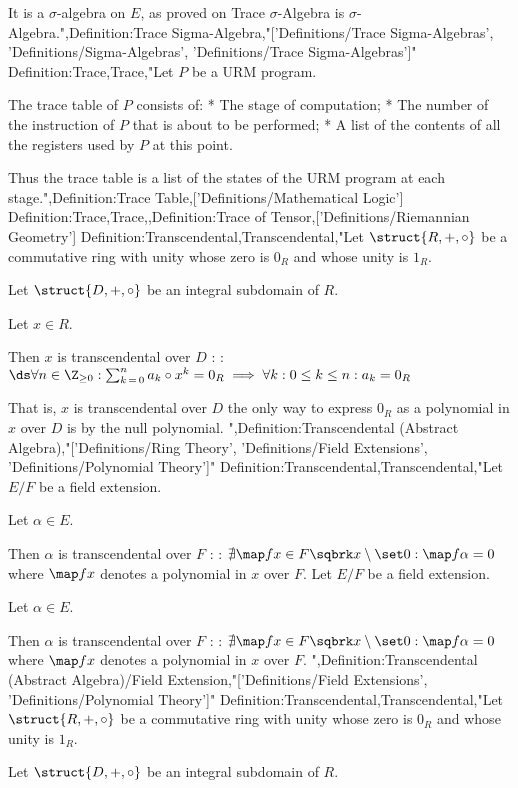 It is a $\sigma$-algebra on $E$, as proved on Trace $\sigma$-Algebra is $\sigma$-Algebra.",Definition:Trace Sigma-Algebra,"['Definitions/Trace Sigma-Algebras', 'Definitions/Sigma-Algebras', 'Definitions/Trace Sigma-Algebras']"
Definition:Trace,Trace,"Let $P$ be a URM program.

The trace table of $P$ consists of:
* The stage of computation;
* The number of the instruction of $P$ that is about to be performed;
* A list of the contents of all the registers used by $P$ at this point.

Thus the trace table is a list of the states of the URM program at each stage.",Definition:Trace Table,['Definitions/Mathematical Logic']
Definition:Trace,Trace,,Definition:Trace of Tensor,['Definitions/Riemannian Geometry']
Definition:Transcendental,Transcendental,"Let $\struct {R, +, \circ}$ be a commutative ring with unity whose zero is $0_R$ and whose unity is $1_R$.

Let $\struct {D, +, \circ}$ be an integral subdomain of $R$.

Let $x \in R$.


Then $x$ is transcendental over $D$ :
:$\ds \forall n \in \Z_{\ge 0}: \sum_{k \mathop = 0}^n a_k \circ x^k = 0_R \implies \forall k: 0 \le k \le n: a_k = 0_R$


That is, $x$ is transcendental over $D$  the only way to express $0_R$ as a polynomial in $x$ over $D$ is by the null polynomial.
",Definition:Transcendental (Abstract Algebra),"['Definitions/Ring Theory', 'Definitions/Field Extensions', 'Definitions/Polynomial Theory']"
Definition:Transcendental,Transcendental,"Let $E / F$ be a field extension.

Let $\alpha \in E$.


Then $\alpha$ is transcendental over $F$ :
: $\nexists \map f x \in F \sqbrk x \setminus \set 0: \map f \alpha = 0$
where $\map f x$ denotes a polynomial in $x$ over $F$.
Let $E / F$ be a field extension.

Let $\alpha \in E$.


Then $\alpha$ is transcendental over $F$ :
: $\nexists \map f x \in F \sqbrk x \setminus \set 0: \map f \alpha = 0$
where $\map f x$ denotes a polynomial in $x$ over $F$.
",Definition:Transcendental (Abstract Algebra)/Field Extension,"['Definitions/Field Extensions', 'Definitions/Polynomial Theory']"
Definition:Transcendental,Transcendental,"Let $\struct {R, +, \circ}$ be a commutative ring with unity whose zero is $0_R$ and whose unity is $1_R$.

Let $\struct {D, +, \circ}$ be an integral subdomain of $R$.


